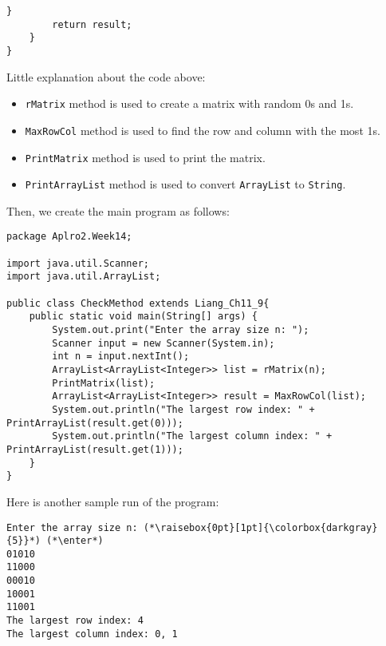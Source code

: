 \documentclass{article}
\newcommand{\enter}{\raisebox{-1.8pt}{\begin{tikzpicture}[scale=0.3]
    \draw[thin,fill=lightgray] (0,0) rectangle (2,1);
    \draw (0.3,0.3) -- (0.7,0.3)--(0.7,0.6);     
\end{tikzpicture}}}
\begin{document}
\begin{enumerate}
\begin{lstlisting}[backgroundcolor=\color{bg}]
        \end{lstlisting}
        \begin{lstlisting}[backgroundcolor=\color{bg}]
        }
        return result;
    }
}
        \end{lstlisting}
        Little explanation about the code above:
        \begin{itemize}
            \item \texttt{rMatrix} method is used to create a matrix with random 0s and 1s.
            \item \texttt{MaxRowCol} method is used to find the row and column with the most 1s.
            \item \texttt{PrintMatrix} method is used to print the matrix.
            \item \texttt{PrintArrayList} method is used to convert \texttt{ArrayList} to \texttt{String}.
        \end{itemize}
        Then, we create the main program as follows:
        \begin{lstlisting}[backgroundcolor=\color{bg}]
package Aplro2.Week14;

import java.util.Scanner;
import java.util.ArrayList;

public class CheckMethod extends Liang_Ch11_9{
    public static void main(String[] args) {
        System.out.print("Enter the array size n: ");
        Scanner input = new Scanner(System.in);
        int n = input.nextInt();
        ArrayList<ArrayList<Integer>> list = rMatrix(n);
        PrintMatrix(list);
        ArrayList<ArrayList<Integer>> result = MaxRowCol(list);
        System.out.println("The largest row index: " + PrintArrayList(result.get(0)));
        System.out.println("The largest column index: " + PrintArrayList(result.get(1)));
    }
}
        \end{lstlisting}
        Here is another sample run of the program:
        \begin{lstlisting}[backgroundcolor=\color{vscode},basicstyle=\small\ttfamily\color{white}]
Enter the array size n: (*\raisebox{0pt}[1pt]{\colorbox{darkgray}{5}}*) (*\enter*)
01010
11000
00010
10001
11001
The largest row index: 4
The largest column index: 0, 1
        \end{lstlisting}


\end{enumerate}
\end{document}
